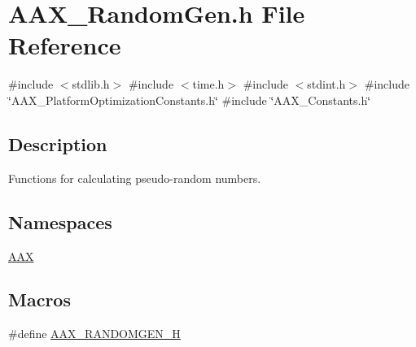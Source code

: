 \hypertarget{a00779}{}\section{A\+A\+X\+\_\+\+Random\+Gen.\+h File Reference}
\label{a00779}
{\ttfamily \#include $<$stdlib.\+h$>$}\newline
{\ttfamily \#include $<$time.\+h$>$}\newline
{\ttfamily \#include $<$stdint.\+h$>$}\newline
{\ttfamily \#include \char`\"{}A\+A\+X\+\_\+\+Platform\+Optimization\+Constants.\+h\char`\"{}}\newline
{\ttfamily \#include \char`\"{}A\+A\+X\+\_\+\+Constants.\+h\char`\"{}}\newline


\subsection{Description}
Functions for calculating pseudo-\/random numbers. 

\subsection*{Namespaces}
\begin{DoxyCompactItemize}
\item 
 \mbox{\hyperlink{a00852}{A\+AX}}
\end{DoxyCompactItemize}
\subsection*{Macros}
\begin{DoxyCompactItemize}
\item 
\#define \mbox{\hyperlink{a00779_a037b85bd9c13c42dee11b4016fa2d90a}{A\+A\+X\+\_\+\+R\+A\+N\+D\+O\+M\+G\+E\+N\+\_\+H}}
\end{DoxyCompactItemize}
